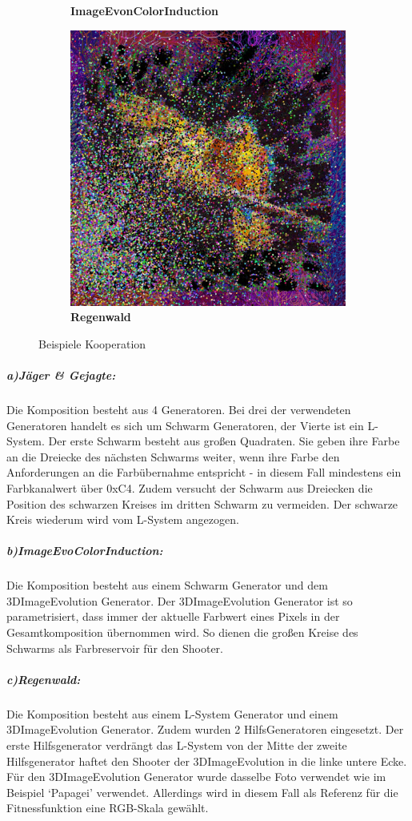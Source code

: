 \documentclass[../mciAusarbeitung.tex]{subfiles}
\begin{document}
\begin{figure}[H]
\begin{subfigure}{0.5\linewidth}
		\caption[ImageEvoColorInduction]{\textbf{ImageEvonColorInduction}}  
		 \end{subfigure}
		\begin{subfigure}{0.5\linewidth}
 		\includegraphics[width=0.95\linewidth]{"img/coop3.jpg"}
		\caption[Regenwald]{\textbf{Regenwald}} 
		\end{subfigure} 
		\caption[BWinzen:Beispiele Kooperation]{Beispiele Kooperation} 
	\end{figure}
\subparagraph{a)Jäger \& Gejagte:} 	Die Komposition besteht aus 4 Generatoren. Bei drei der verwendeten Generatoren handelt es sich um Schwarm Generatoren, der Vierte ist ein L-System. Der erste Schwarm besteht aus großen Quadraten. Sie geben ihre Farbe an die Dreiecke des nächsten Schwarms weiter, wenn ihre Farbe den Anforderungen an die Farbübernahme entspricht - in diesem Fall mindestens ein Farbkanalwert über 0xC4. Zudem versucht der Schwarm aus Dreiecken die Position des schwarzen Kreises im dritten Schwarm zu vermeiden. Der schwarze Kreis wiederum wird vom L-System angezogen.		
\subparagraph{b)ImageEvoColorInduction:} Die Komposition besteht aus einem Schwarm Generator und dem 3DImageEvolution Generator. Der 3DImageEvolution Generator ist so parametrisiert, dass immer der aktuelle Farbwert eines Pixels in der Gesamtkomposition übernommen wird. So dienen die großen Kreise des Schwarms als Farbreservoir für den Shooter. 		 
\subparagraph{c)Regenwald:}	Die Komposition besteht aus einem L-System Generator und einem 3DImageEvolution Generator. Zudem wurden 2 HilfsGeneratoren eingesetzt. Der erste Hilfsgenerator verdrängt das L-System von der Mitte der zweite Hilfsgenerator haftet den Shooter der 3DImageEvolution in die linke untere Ecke. Für den 3DImageEvolution Generator wurde dasselbe Foto verwendet wie im Beispiel `Papagei' verwendet. Allerdings wird in diesem Fall als Referenz für die Fitnessfunktion eine RGB-Skala gewählt.
\end{document}
